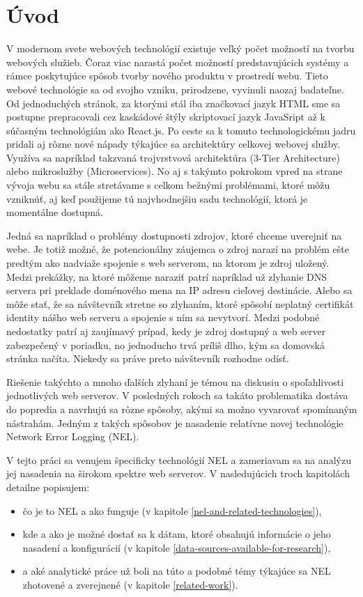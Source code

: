 \chapter{Úvod}
\label{uvod}
\vspace{1cm}

V modernom svete webových technológií existuje veľký počet možností na tvorbu webových služieb. Čoraz viac narastá počet možností predstavujúcich systémy a rámce poskytujúce spôsob tvorby nového produktu v prostredí webu.
Tieto webové technológie sa od svojho vzniku, prirodzene, vyvinuli naozaj badateľne. 
Od jednoduchých stránok, za ktorými stál iba značkovací jazyk 
HTML sme sa postupne prepracovali cez kaskádové štýly skriptovací jazyk 
JavaSript až k súčasným technológiám ako React.js. 
Po ceste sa k tomuto technologickému jadru pridali aj rôzne 
nové nápady týkajúce sa architektúry celkovej webovej služby. 
Využíva sa napríklad takzvaná trojvrstvová architektúra (3-Tier Architecture) alebo mikroslužby (Microservices). 
No aj s takýmto pokrokom vpred na strane vývoja webu sa stále stretávame s celkom bežnými problémami, ktoré môžu vzniknúť, aj 
keď použijeme tú najvhodnejšiu sadu technológií, ktorá je momentálne dostupná.

Jedná sa napríklad o problémy dostupnosti zdrojov, ktoré chceme uverejniť na webe. 
Je totiž možné, že potencionálny záujemca o zdroj narazí na problém ešte predtým ako nadviaže spojenie s web serverom, na ktorom je zdroj uložený.
Medzi prekážky, na ktoré môžeme naraziť patrí napríklad už zlyhanie DNS servera pri preklade doménového mena na IP adresu cieľovej destinácie. 
Alebo sa môže stať, že sa návštevník stretne so zlyhaním, ktoré spôsobí neplatný certifikát identity nášho web serveru a spojenie s ním sa nevytvorí. 
Medzi podobné nedostatky patrí aj zaujímavý prípad, kedy je zdroj dostupný a web server zabezpečený v poriadku, no jednoducho trvá príliš dlho, kým sa domovská stránka načíta. Niekedy sa práve preto návštevník rozhodne odísť.

Riešenie takýchto a mnoho ďalších zlyhaní je témou na diskusiu o spoľahlivosti jednotlivých web serverov. 
V posledných rokoch sa takáto problematika dostáva do popredia a navrhujú sa rôzne 
spôsoby, akými sa možno vyvarovať spomínaným nástrahám. Jedným z takých spôsobov je nasadenie relatívne novej 
technológie Network Error Logging (NEL).

\pagebreak

V tejto práci sa venujem špecificky technológií NEL a zameriavam sa na analýzu jej nasadenia na širokom spektre web serverov. 
V nasledujúcich troch kapitolách detailne popisujem:
\begin{itemize}
    \item čo je to NEL a ako funguje (v kapitole \ref{nel-and-related-technologies}),
    \item kde a ako je možné dostať sa k dátam, ktoré obsahujú informácie o jeho nasadení a 
konfigurácií (v kapitole \ref{data-sources-available-for-research}),
    \item a aké analytické práce už boli na túto a podobné témy
týkajúce sa NEL zhotovené a zverejnené (v kapitole \ref{related-work}).
\end{itemize}

